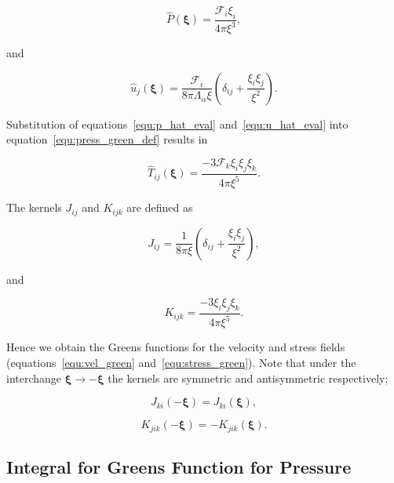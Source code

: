 \documentclass[12pt]{article}
\begin{document}
\begin{equation}
\label{equ:p_hat_eval}
\hat{P} (\boldsymbol\xi) = \frac{\mathcal{F}_{i} \xi_{i}}{4 \pi \xi^{3}},
\end{equation}

and 

\begin{equation}
\label{equ:u_hat_eval}
\hat{u}_{j}(\boldsymbol\xi) = \frac{\mathcal{F}_{i}}{8 \pi \Lambda_{\alpha} \xi} \left(\delta_{ij} + \frac{\xi_{i} \xi_{j}}{\xi^{2}} \right).
\end{equation}


Substitution of equations~\ref{equ:p_hat_eval} and~\ref{equ:u_hat_eval} into equation~\ref{equ:press_green_def} results in

\begin{equation}
\label{equ:green_stress}
\hat{T}_{ij} (\boldsymbol\xi) = \frac{-3 \mathcal{F}_{k} \xi_{i} \xi_{j} \xi_{k}}{4 \pi \xi^{5}}.
\end{equation}


The kernels $J_{ij}$ and $K_{ijk}$ are defined as

\begin{equation}
\label{equ:j_kernel}
J_{ij} = \frac{1}{8 \pi \xi} \left(\delta_{ij} + \frac{\xi_{i} \xi_{j}}{\xi^{2}} \right),
\end{equation}

and 

\begin{equation}
\label{equ:k_kernel}
K_{ijk} = \frac{-3 \xi_{i} \xi_{j} \xi_{k}}{4 \pi \xi^{5}}.
\end{equation}

Hence we obtain the Greens functions for the velocity and stress fields (equations~\ref{equ:vel_green} and~\ref{equ:stress_green}). Note that under the interchange $\boldsymbol\xi \to -\boldsymbol\xi$ the kernels are symmetric and antisymmetric respectively;

\begin{equation}
\label{equ:j_sym}
J_{ki}(-\boldsymbol\xi) = J_{ki}(\boldsymbol\xi),
\end{equation}

\begin{equation}
\label{equ:k_sym}
K_{jik}(-\boldsymbol\xi) = -K_{jik}(\boldsymbol\xi).
\end{equation}


\subsection{Integral for Greens Function for Pressure}
\label{sub_app:green_p}
\end{document}
